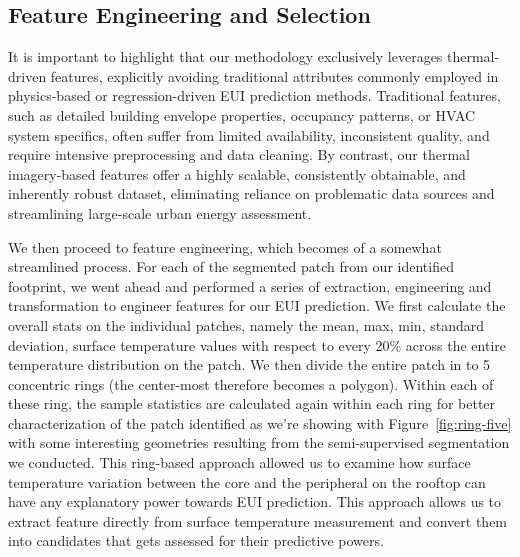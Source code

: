 \documentclass[preprint,12pt]{elsarticle}
\begin{document}
   \subsection{Feature Engineering and Selection}%
        It is important to highlight that our methodology exclusively leverages thermal-driven features, explicitly avoiding traditional attributes commonly employed in physics-based or regression-driven EUI prediction methods. Traditional features, such as detailed building envelope properties, occupancy patterns, or HVAC system specifics, often suffer from limited availability, inconsistent quality, and require intensive preprocessing and data cleaning. By contrast, our thermal imagery-based features offer a highly scalable, consistently obtainable, and inherently robust dataset, eliminating reliance on problematic data sources and streamlining large-scale urban energy assessment.
        
        We then proceed to feature engineering, which becomes of a somewhat streamlined process. For each of the segmented patch from our identified footprint, we went ahead and performed a series of extraction, engineering and transformation to engineer features for our EUI prediction. We first calculate the overall stats on the individual patches, namely the mean, max, min, standard deviation, surface temperature values with respect to  every 20\% across the entire temperature distribution on the patch. We then divide the entire patch in to 5 concentric rings (the center-most therefore becomes a polygon). Within each of these ring, the sample statistics are calculated again within each ring for better characterization of the patch identified as we're showing with Figure~\ref{fig:ring-five} with some interesting geometries resulting from the semi-supervised segmentation we conducted. This ring-based approach allowed us to examine how surface temperature variation between the core and the peripheral on the rooftop can have any explanatory power towards EUI prediction. This approach allows us to extract feature directly from surface temperature measurement and convert them into candidates that gets assessed for their predictive powers.
\end{document}
